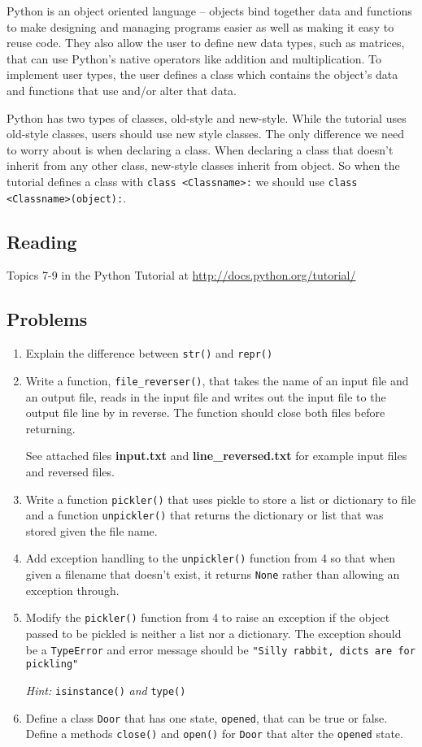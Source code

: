 Python is an object oriented language -- objects bind together data and functions to make designing and managing programs easier as well as making it easy to reuse code. They also allow the user to define new data types, such as matrices, that can use Python's native operators like addition and multiplication. To implement user types, the user defines a \gls{class} which contains the object's data and functions that use and/or alter that data.

Python has two types of classes, old-style and new-style. While the tutorial uses old-style classes, users should use new style classes. The only difference we need to worry about is when declaring a class. When declaring a class that doesn't inherit from any other class, new-style classes inherit from object. So when the tutorial defines a class with \verb|class <Classname>:| we should use \verb|class <Classname>(object):|.

\subsection{Reading}
Topics 7-9 in the Python Tutorial at \url{http://docs.python.org/tutorial/} \cite{website:Python272docs}
\subsection{Problems}
\begin{enumerate}
	\item Explain the difference between \verb|str()| and \verb|repr()|
	\item Write a function, \verb|file_reverser()|, that takes the name of an input file and an output file, reads in the input file and writes out the input file to the output file line by in reverse. The function should close both files before returning.

See attached files \textbf{input.txt} and \textbf{line\_reversed.txt} for example input files and reversed files.
	\item Write a function \verb|pickler()| that uses pickle to store a list or dictionary to file and a function \verb|unpickler()| that returns the dictionary or list that was stored given the file name.
	\item Add exception handling to the \verb|unpickler()| function from 4 so that when given a filename that doesn't exist, it returns \verb|None| rather than allowing an exception through.
	\item Modify the \verb|pickler()| function from 4 to raise an exception if the object passed to be pickled is neither a list nor a dictionary. The exception should be a \verb|TypeError| and error message should be \verb|"Silly rabbit, dicts are for pickling"|

\emph{Hint: }\verb|isinstance()| \emph{and} \verb|type()|

	\item Define a class \verb|Door| that has one state, \verb|opened|, that can be true or false. Define a methods \verb|close()| and \verb|open()| for \verb|Door| that alter the \verb|opened| state. 

\end{enumerate}
